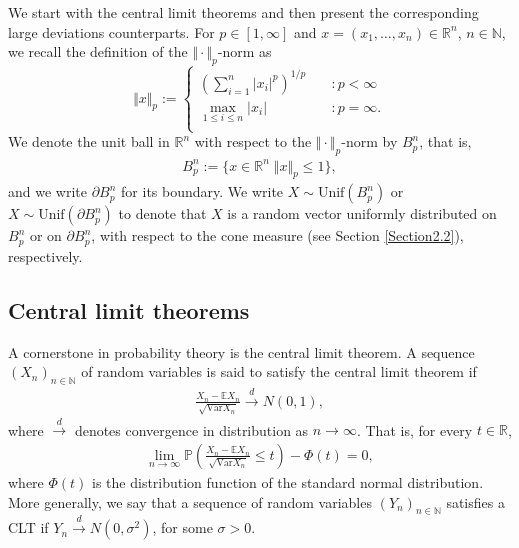\documentclass[10pt]{amsart}
\newcounter{theor}
\def\R{\mathbb{R}}
\def\N{\mathbb{N}}
\def\Var{\text{Var}}
\numberwithin{equation}{section}
\begin{document}
 
We start with the central limit theorems and then present the corresponding large deviations counterparts. For $p \in [1, \infty ]$ and $x = (x_1, \ldots , x_n) \in \R^n$, $n\in \N$, we recall the definition of the $\Vert \cdot \Vert _p$-norm as 
\[   
\Vert x \Vert _p := 
     \begin{cases}
       \left( \sum _{i=1} ^n |x_i|^p \right)^{1/p} &\quad : p < \infty\\
       \max _{1 \leq i \leq n} |x_i| &\quad : p = \infty . \\
     \end{cases}
\]
We denote the unit ball in $\R^n$ with respect to the $\Vert \cdot \Vert _p$-norm by $B_p^n$, that is, 
\begin{align*}
B_p^n := \lbrace x \in \R^n \; \Vert x \Vert _p \leq 1 \rbrace,
\end{align*}
and we write $\partial B_p^n$ for its boundary. We write $X \sim \text{Unif} ( B_p^n)$ or $X \sim \text{Unif} ( \partial B_p^n)$ to denote that $X$ is a random vector uniformly distributed on $B_p^n$ or on $ \partial B_p^n$, with respect to the cone measure (see Section \ref{Section2.2}), respectively.



\subsection{Central limit theorems}

A cornerstone in probability theory is the central limit theorem. A sequence $(X_n)_{n \in \N}$
of random variables is said to satisfy the central limit theorem if 
\begin{align*}
\frac{X_n - \mathbb{E} X_n}{\sqrt{\Var X_n}} \overset{d}{\rightarrow} N(0,1),
\end{align*} 
where $\overset{d}{\rightarrow}$ denotes convergence in distribution as $n\to\infty$. That is, for every $t \in \R$,
\begin{align*}
\lim _{n \to \infty} \mathbb{P} \left( \frac{X_n - \mathbb{E} X_n}{\sqrt{\Var X_n}} \leq t \right) - \Phi (t) = 0,
\end{align*}
where $\Phi (t)$ is the distribution function of the standard normal distribution.
More generally, we say that a sequence of random variables $(Y_n)_{n \in \N}$ satisfies a CLT if $Y_n \overset{d}{\to} N(0, \sigma ^2)$, for some $\sigma > 0$.
\end{document}
